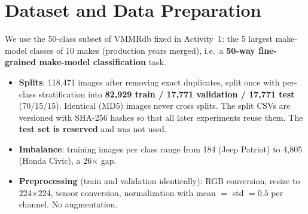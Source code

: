 \documentclass[10pt,a4paper,twocolumn]{article}
\newcommand{\hl}[1]{\textbf{#1}}
\begin{document}

\section{Dataset and Data Preparation}
We use the 50-class subset of VMMRdb \cite{vmmr} fixed in Activity~1: the 5 largest make-model classes of 10 makes
(production years merged), i.e.\ a \hl{50-way fine-grained make-model classification} task.
\begin{itemize}
  \item \hl{Splits}: 118,471 images after removing exact duplicates, split once with per-class stratification
  into \hl{82,929 train / 17,771 validation / 17,771 test} (70/15/15). Identical (MD5) images never cross splits.
  The split CSVs are versioned with SHA-256 hashes so that all later experiments reuse them.
  The \hl{test set is reserved} and was not used.
  \item \hl{Imbalance}: training images per class range from 184 (Jeep Patriot) to 4,805 (Honda Civic), a 26$\times$ gap.
  \item \hl{Preprocessing} (train and validation identically): RGB conversion, resize to 224$\times$224, tensor conversion,
  normalization with mean $=$ std $=0.5$ per channel. No augmentation.
\end{itemize}

\end{document}
